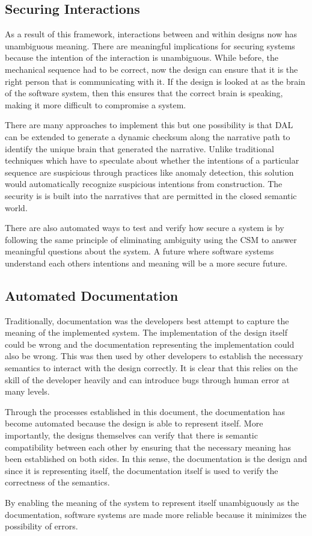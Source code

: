\subsection{Securing Interactions}

As a result of this framework, interactions between and within designs now has unambiguous meaning. There are meaningful implications for securing systems because the intention of the interaction is unambiguous. While before, the mechanical sequence had to be correct, now the design can ensure that it is the right person that is communicating with it. If the design is looked at as the brain of the software system, then this ensures that the correct brain is speaking, making it more difficult to compromise a system.

There are many approaches to implement this but one possibility is that DAL can be extended to generate a dynamic checksum along the narrative path to identify the unique brain that generated the narrative. Unlike traditional techniques which have to speculate about whether the intentions of a particular sequence are suspicious through practices like anomaly detection, this solution would automatically recognize suspicious intentions from construction. The security is is built into the narratives that are permitted in the closed semantic world. 

There are also automated ways to test and verify how secure a system is by following the same principle of eliminating ambiguity using the CSM to answer meaningful questions about the system. A future where software systems understand each others intentions and meaning will be a more secure future. 

\subsection{Automated Documentation}

Traditionally, documentation was the developers best attempt to capture the meaning of the implemented system. The implementation of the design itself could be wrong and the documentation representing the implementation could also be wrong. This was then used by other developers to establish the necessary semantics to interact with the design correctly. It is clear that this relies on the skill of the developer heavily and can introduce bugs through human error at many levels.

Through the processes established in this document, the documentation has become automated because the design is able to represent itself. More importantly, the designs themselves can verify that there is semantic compatibility between each other by ensuring that the necessary meaning has been established on both sides. In this sense, the documentation is the design and since it is representing itself, the documentation itself is used to verify the correctness of the semantics. 

By enabling the meaning of the system to represent itself unambiguously as the documentation, software systems are made more reliable because it minimizes the possibility of errors.